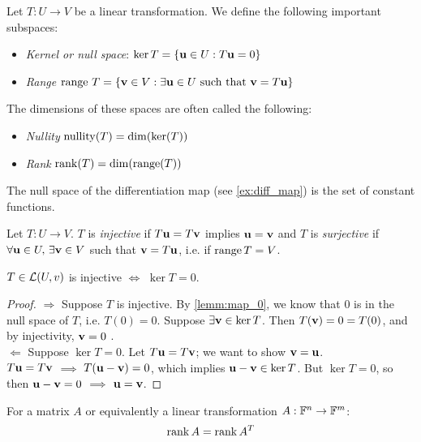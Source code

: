 \documentclass{article}
\begin{document}
\begin{definition}
Let $T:U \to V$ be a linear transformation. We define the following important subspaces:
\begin{itemize}
\item \emph{Kernel or null space}: $\ker T = \{{\mathbf{u}} \in U : T{\mathbf{u}} = 0 \}$
\item \emph{Range} $\operatorname{range} \, T = \{{\mathbf{v}} \in V : \exists {\mathbf{u}} \in U \text{ such that } {\mathbf{v}} = T {\mathbf{u}} \}$
\end{itemize}
The dimensions of these spaces are often called the following:
\begin{itemize}
\item \emph{Nullity} $\operatorname{nullity}(T) = \dim(\ker(T))$
\item \emph{Rank} $\operatorname{rank}(T) = \dim(\operatorname{range}(T))$
\end{itemize}
\end{definition}

\begin{example}
The null space of the differentiation map (see \cref{ex:diff_map}) is the set of constant functions.
\end{example}

\begin{definition}
Let $T:U \to V$. $T$ is \emph{injective} if $T{\mathbf{u}} = T{\mathbf{v}}$ implies ${\mathbf{u}} = {\mathbf{v}}$ and $T$ is \emph{surjective} if $\forall {\mathbf{u}} \in U, \, \exists {\mathbf{v}} \in V$ such that ${\mathbf{v}} = T{\mathbf{u}}$, i.e. if $\operatorname{range} T = V$.
\end{definition}

\begin{theorem}
$T \in {\mathcal{L}}(U,v)$ is injective $\Longleftrightarrow$ $\ker T = 0$.
\end{theorem}

\begin{proof}
$\Rightarrow$ Suppose $T$ is injective. By \cref{lemm:map_0}, we know that 0 is in the null space of $T$, i.e. $T(0) = 0$. Suppose $\exists {\mathbf{v}} \in \ker T$. Then $T({\mathbf{v}}) = 0 = T(0)$, and by injectivity, ${\mathbf{v}} = 0$ . \\
$\Leftarrow$ Suppose $\ker T = 0$. Let $T{\mathbf{u}} = T{\mathbf{v}}$; we want to show ${\mathbf{v}} = {\mathbf{u}}$. \\
$T{\mathbf{u}} = T{\mathbf{v}}$ $\implies$ $T ({\mathbf{u}} - {\mathbf{v}}) = 0$, which implies ${\mathbf{u}} - {\mathbf{v}} \in \ker T$. But $\ker T = 0$, so then ${\mathbf{u}} - {\mathbf{v}} = 0$ $\implies$ ${\mathbf{u}}={\mathbf{v}}$.
\end{proof}

\begin{theorem}
For a matrix $A$ or equivalently a linear transformation $A: {\mathbb{F}}^n \to {\mathbb{F}}^m$:
\begin{equation*}
\operatorname{rank} A = \operatorname{rank} A^T 
\end{equation*}
\end{theorem}
\end{document}

